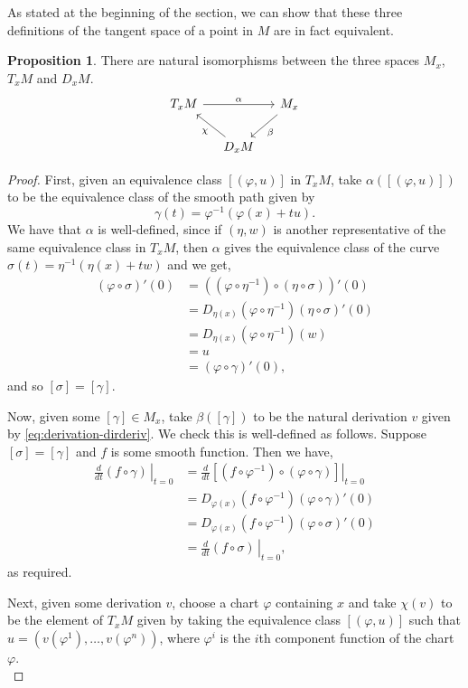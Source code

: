 \documentclass[12pt,a4paper]{article}
\numberwithin{equation}{section}
\theoremstyle{definition}
\newtheorem{proposition}{Proposition}[section]
\theoremstyle{remark}
\begin{document}
As stated at the beginning of the section, we can show that these three definitions of the tangent space of a point in $M$ are in fact equivalent.
\begin{proposition}
There are natural isomorphisms between the three spaces $M_x$, $T_xM$ and $D_xM$.
\[
\begin{tikzcd}[column sep=small]
T_xM \arrow{rr}{\alpha} && M_x\arrow{dl}{\beta}\\
&D_xM\arrow{ul}{\chi}
\end{tikzcd}
\]
\end{proposition}
\begin{proof}
First, given an equivalence class $[(\varphi,u)]$ in $T_xM$, take $\alpha([(\varphi,u)])$ to be the equivalence class of the smooth path given by
\[
\gamma(t)=\varphi^{-1}(\varphi(x)+tu).
\]
We have that $\alpha$ is well-defined, since if $(\eta,w)$ is another representative of the same equivalence class in $T_xM$, then $\alpha$ gives the equivalence class of the curve $\sigma(t)=\eta^{-1}(\eta(x)+tw)$ and we get,
\begin{align*}
(\varphi\circ\sigma)'(0)&=\left((\varphi\circ\eta^{-1})\circ(\eta\circ\sigma) \right)'(0)\\
&=D_{\eta(x)}\left(\varphi\circ\eta^{-1} \right)(\eta\circ\sigma)'(0)\\
&=D_{\eta(x)}\left(\varphi\circ\eta^{-1}\right)(w)\\
&=u\\
&=(\varphi\circ\gamma)'(0),
\end{align*}
and so $[\sigma]=[\gamma]$.

Now, given some $[\gamma]\in M_x$, take $\beta([\gamma])$ to be the natural derivation $v$ given by \eqref{eq:derivation-dirderiv}. We check this is well-defined as follows. Suppose $[\sigma]=[\gamma]$ and $f$ is some smooth function. Then we have,
\begin{align*}
\left.\frac{d}{dt}(f\circ\gamma)\,\right\rvert_{t=0}&=\left.\frac{d}{dt}\left[(f\circ\varphi^{-1})\circ(\varphi\circ\gamma) \right]\right\rvert_{t=0}\\
&=D_{\varphi(x)}(f\circ\varphi^{-1})(\varphi\circ\gamma)'(0)\\
&=D_{\varphi(x)}(f\circ\varphi^{-1})(\varphi\circ\sigma)'(0)\\
&=\left.\frac{d}{dt}(f\circ\sigma)\,\right\rvert_{t=0},
\end{align*}
as required.

Next, given some derivation $v$, choose a chart $\varphi$ containing $x$ and take $\chi(v)$ to be the element of $T_xM$ given by taking the equivalence class $[(\varphi,u)]$ such that $u=\left(v(\varphi^1),\ldots,v(\varphi^n)\right)$, where $\varphi^i$ is the $i$th component function of the chart $\varphi$.\\


\end{proof}
\end{document}
